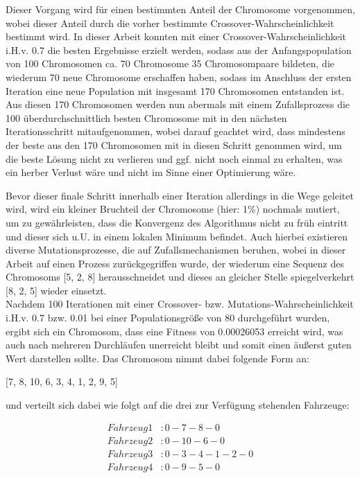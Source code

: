 \documentclass[a4paper,12pt,parskip,bibtotoc,liststotoc]{article}
\begin{document}
Dieser Vorgang wird für einen bestimmten Anteil der Chromosome vorgenommen, wobei dieser Anteil durch die vorher bestimmte Crossover-Wahrscheinlichkeit bestimmt wird. 
In dieser Arbeit konnten mit einer Crossover-Wahrscheinlichkeit i.H.v. 0.7 die besten Ergebnisse erzielt werden, sodass aus der Anfangspopulation von 100 Chromosomen ca. 70 Chromosome 35 Chromosompaare bildeten, die wiederum 70 neue Chromosome erschaffen haben, sodass im Anschluss der ersten Iteration eine neue Population mit insgesamt 170 Chromosomen entstanden ist. 
Aus diesen 170 Chromosomen werden nun abermals mit einem Zufallsprozess die 100 überdurchschnittlich besten Chromosome mit in den nächsten Iterationsschritt mitaufgenommen, wobei darauf geachtet wird, dass mindestens der beste aus den 170 Chromosomen mit in diesen Schritt genommen wird, um die beste Lösung nicht zu verlieren und ggf. nicht noch einmal zu erhalten, was ein herber Verlust wäre und nicht im Sinne einer Optimierung wäre.

Bevor dieser finale Schritt innerhalb einer Iteration allerdings in die Wege geleitet wird, wird ein kleiner Bruchteil der Chromosome (hier: 1\%) nochmals mutiert, um zu gewährleisten, dass die Konvergenz des Algorithmus nicht zu früh eintritt und dieser sich u.U. in einem lokalen Minimum befindet. 
Auch hierbei existieren diverse Mutationsprozesse, die auf Zufallsmechanismen beruhen, wobei in dieser Arbeit auf einen Prozess zurückgegriffen wurde, der wiederum eine Sequenz des Chromosoms [5, 2, 8] herausschneidet und dieses an gleicher Stelle spiegelverkehrt [8, 2, 5] wieder einsetzt.\\

Nachdem 100 Iterationen mit einer Crossover- bzw. Mutations-Wahrscheinlichkeit i.H.v. 0.7 bzw. 0.01 bei einer Populationsgröße von 80 durchgeführt wurden, ergibt sich ein Chromosom, dass eine Fitness von 0.00026053 erreicht wird, was auch nach mehreren Durchläufen unerreicht bleibt und somit einen äußerst guten Wert darstellen sollte.
Das Chromosom nimmt dabei folgende Form an: 

\begin{center}
[7, 8, 10, 6, 3, 4, 1, 2, 9, 5]
\end{center}

und verteilt sich dabei wie folgt auf die drei zur Verfügung stehenden Fahrzeuge: 


\begin{equation} \label{eq:test}
    \begin{aligned} 
         Fahrzeug 1&: 0 - 7 - 8 - 0 \\
        Fahrzeug 2&: 0 - 10 - 6 - 0\\
       Fahrzeug 3&: 0 - 3 - 4 - 1 - 2 - 0\\    
       Fahrzeug 4&: 0 - 9 - 5 - 0
    \end{aligned}
\end{equation}
\end{document}
